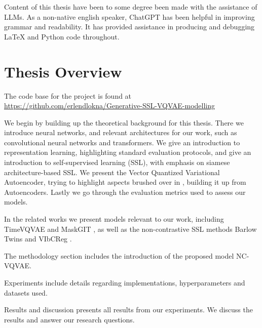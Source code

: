 \documentclass[../../thesis.tex]{subfiles}
\begin{document}
Content of this thesis have been to some degree been made with the assistance of LLMs. As a non-native english speaker, ChatGPT has been helpful in improving grammar and readability. It has provided assistance in producing and debugging LaTeX and Python code throughout.

\section{Thesis Overview}
The code base for the project is found at \url{https://github.com/erlendlokna/Generative-SSL-VQVAE-modelling}\newline

We begin by building up the theoretical background for this thesis. There we introduce neural networks, and relevant architectures for our work, such as convolutional neural networks and transformers. We give an introduction to representation learning, highlighting standard evaluation protocols, and give an introduction to self-supervised learning (SSL), with emphasis on siamese architecture-based SSL. We present the Vector Quantized Variational Autoencoder, trying to highlight aspects brushed over in \cite{VQVAE}, building it up from Autoencoders. Lastly we go through the evaluation metrics used to assess our models.\newline

In the related works we present models relevant to our work, including TimeVQVAE \cite{TimeVQVAE} and MaskGIT \cite{chang2022maskgit}, as well as the non-contrastive SSL methods Barlow Twins \cite{zbontar2021barlow} and VIbCReg \cite{lee2024computer}.\newline

The methodology section includes the introduction of the proposed model NC-VQVAE.\newline

Experiments include details regarding implementations, hyperparameters and datasets used. \newline

Results and discussion presents all results from our experiments. We discuss the results  and answer our research questions. 
\end{document}

